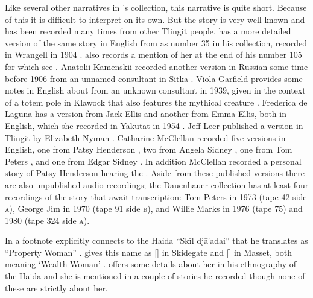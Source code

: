 Like several other narratives in \citeauthor{swanton:1909}’s collection, this narrative is quite short.
Because of this it is difficult to interpret on its own.
But the story is very well known and has been recorded many times from other Tlingit people.
\citeauthor{swanton:1909} has a more detailed version of the same story in English from  as number 35 in his collection, recorded in Wrangell in 1904 \parencite[173–175]{swanton:1909}.
\citeauthor{swanton:1909} also records a mention of her at the end of his number 105 for which see . 
Anatolii Kamenskii recorded another version in Russian some time before 1906 from an unnamed consultant in Sitka \parencites{kamenskii:1906}[68–70]{kamenskii-kan:1985}.
Viola Garfield provides some notes in English about  from an unknown consultant in 1939, given in the context of a totem pole in Klawock that also features the  mythical creature \parencite[117–118]{garfield-forrest:1948}.
Frederica de Laguna has a version from  Jack Ellis and another from  Emma Ellis, both in English, which she recorded in Yakutat in 1954 \parencite[884]{de-laguna:1972}.
Jeff Leer published a version in Tlingit by  Elizabeth Nyman \parencite[218–255]{nyman:1993}.
Catharine McClellan recorded five versions in English, one from  Patsy Henderson \parencite[238–241]{mcclellan-cruikshank:2007b}, two from  Angela Sidney \parencite[344–348, 348–353]{mcclellan-cruikshank:2007b}, one from  Tom Peters \parencite[715–719]{mcclellan-cruikshank:2007c}, and one from  Edgar Sidney \parencite[747–753]{mcclellan-cruikshank:2007c}.
In addition McClellan recorded a personal story of  Patsy Henderson hearing the  \parencite[241–244]{mcclellan-cruikshank:2007b}.
Aside from these published versions there are also unpublished audio recordings;
the Dauenhauer collection has at least four recordings of the story that await transcription:  Tom Peters in 1973 (tape 42 side \textsc{a}),  George Jim in 1970 (tape 91 side \textsc{b}), and  Willie Marks in 1976 (tape 75) and 1980 (tape 324 side \textsc{a}).

In a footnote \citeauthor{swanton:1909} explicitly connects  to the Haida “Skîl djā′adai” that he translates as “Property Woman” \parencite[292 fn.\ a]{swanton:1909}.
\citeauthor{enrico:2005} gives this name as  [] in Skidegate and  [] in Masset, both meaning ‘Wealth Woman’ \parencite[525]{enrico:2005}.
\citeauthor{swanton:1905a} offers some details about her in his ethnography of the Haida \parencite[29]{swanton:1905a} and she is mentioned in a couple of stories he recorded \parencites{swanton:1905b}{swanton:1908a} though none of these are strictly about her.

